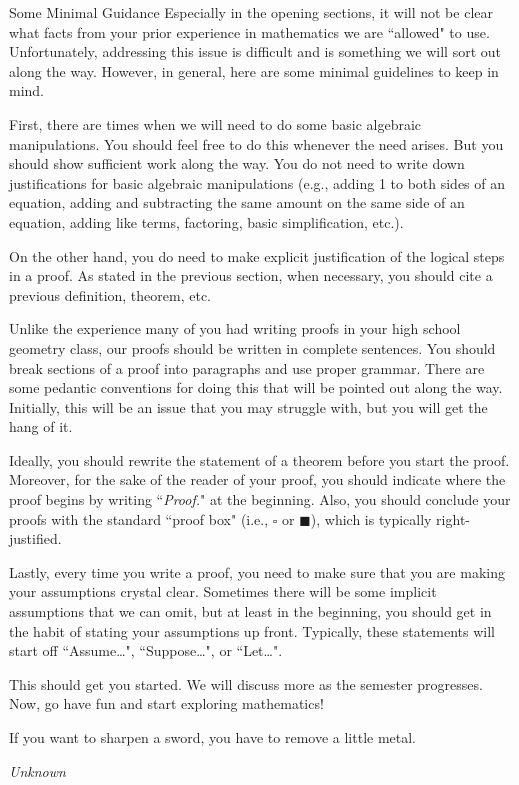 \begin{section}{Some Minimal Guidance}
Especially in the opening sections, it will not be clear what facts from your prior experience in mathematics we are ``allowed" to use.  Unfortunately, addressing this issue is difficult and is something we will sort out along the way.  However, in general, here are some minimal guidelines to keep in mind.  

First, there are times when we will need to do some basic algebraic manipulations.  You should feel free to do this whenever the need arises.  But you should show sufficient work along the way.  You do not need to write down justifications for basic algebraic manipulations (e.g., adding 1 to both sides of an equation, adding and subtracting the same amount on the same side of an equation, adding like terms, factoring, basic simplification, etc.).  

On the other hand, you do need to make explicit justification of the logical steps in a proof.  As stated in the previous section, when necessary, you should cite a previous definition, theorem, etc.

Unlike the experience many of you had writing proofs in your high school geometry class, our proofs should be written in complete sentences.  You should break sections of a proof into paragraphs and use proper grammar.  There are some pedantic conventions for doing this that will be pointed out along the way.  Initially, this will be an issue that you may struggle with, but you will get the hang of it.

Ideally, you should rewrite the statement of a theorem before you start the proof.  Moreover, for the sake of the reader of your proof, you should indicate where the proof begins by writing ``\emph{Proof.}" at the beginning.  Also, you should conclude your proofs with the standard ``proof box" (i.e., $\square$ or $\blacksquare$), which is typically right-justified.

Lastly, every time you write a proof, you need to make sure that you are making your assumptions crystal clear.  Sometimes there will be some implicit assumptions that we can omit, but at least in the beginning, you should get in the habit of stating your assumptions up front.  Typically, these statements will start off ``Assume\ldots", ``Suppose\ldots", or ``Let\ldots".  

This should get you started.  We will discuss more as the semester progresses.  Now, go have fun and start exploring mathematics!

\epigraph{If you want to sharpen a sword, you have to remove a little metal.}{\emph{Unknown}}

\end{section}